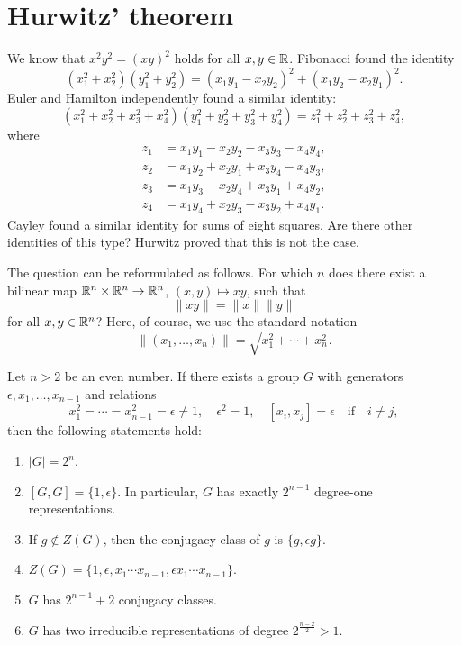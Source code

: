 \section{Hurwitz' theorem}

We know that $x^2y^2=(xy)^2$ holds for all $x,y\in\mathbb{R}$. Fibonacci
found the identity
\begin{equation}
\label{eq:2squares}
	(x_1^2+x_2^2)(y_1^2+y_2^2)=(x_1y_1-x_2y_2)^2+(x_1y_2-x_2y_1)^2.
\end{equation}
Euler and Hamilton independently found 
a similar identity:
\[
	(x_1^2+x_2^2+x_3^2+x_4^2)(y_1^2+y_2^2+y_3^2+y_4^2)=z_1^2+z_2^2+z_3^2+z_4^2,
\]
where
\begin{equation}
\label{eq:Hamilton}
\begin{aligned}
	 z_1&=x_1y_1-x_2y_2-x_3y_3-x_4y_4,\\
	 z_2&=x_1y_2+x_2y_1+x_3y_4-x_4y_3,\\
	 z_3&=x_1y_3-x_2y_4+x_3y_1+x_4y_2,\\ 
	 z_4&=x_1y_4+x_2y_3-x_3y_2+x_4y_1.
\end{aligned}
\end{equation}
Cayley found a similar identity for sums of eight squares. 
Are there other identities of this type? Hurwitz
proved that this is not the case. 

The question can be reformulated as follows. For which $n$ does there 
exist a bilinear map $\mathbb{R}^n\times\mathbb{R}^n\to\mathbb{R}^n$, 
$(x,y)\mapsto xy$, such that
\[
\|xy\|=\|x\|\|y\|
\]
for all $x,y\in\mathbb{R}^n$? Here, of course, we use the 
standard notation
\[
\|(x_1,\dots,x_n)\|=\sqrt{x_1^2+\cdots+x_n^2}.
\]

 \begin{lemma}
 \label{lem:hurwitz_group}
 	Let $n>2$ be an even number. If 
 	there exists a group $G$ with generators
 	$\epsilon,x_1,\dots,x_{n-1}$ and relations 
 	\[
 		x_1^2=\cdots=x_{n-1}^2=\epsilon\ne1,\quad
 		\epsilon^2=1,\quad
 		[x_i,x_j]=\epsilon\quad\text{if}\quad i\ne j,
 	\]
 	then the following statements hold:
 	\begin{enumerate}
 		\item $|G|=2^n$.
 		\item $[G,G]=\{1,\epsilon\}$. In particular, $G$ 
 		    has exactly $2^{n-1}$ degree-one representations. 
 		\item If $g\not\in Z(G)$, then the conjugacy class of $g$ is $\{g,\epsilon g\}$.
 		\item $Z(G)=\{1,\epsilon,x_1\cdots x_{n-1},\epsilon x_1\cdots x_{n-1}\}$. 
 		\item $G$ has $2^{n-1}+2$ conjugacy classes.
 		\item $G$ has two irreducible representations of degree $2^{\frac{n-2}{2}}>1$. 
 	\end{enumerate}
 \end{lemma}

